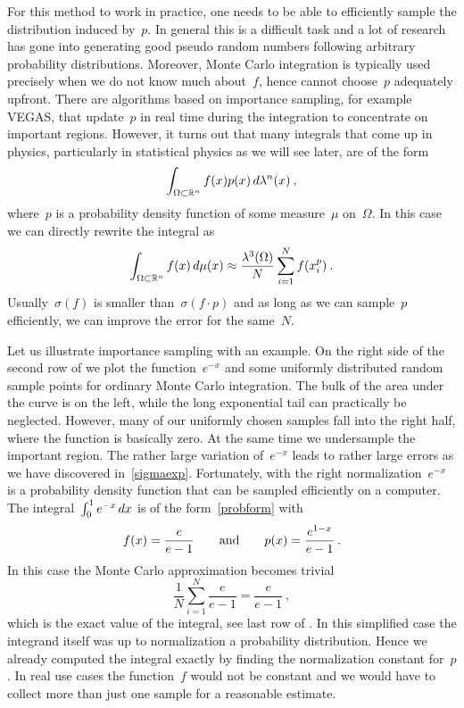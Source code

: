 For this method to work in practice, one needs to be able to efficiently sample
the distribution induced by~$p$. In general this is a difficult task and a lot
of research has gone into generating good pseudo random numbers following
arbitrary probability distributions. Moreover, Monte Carlo integration is
typically used precisely when we do not know much about~$f$, hence cannot
choose~$p$ adequately upfront. There are algorithms based on importance
sampling, for example VEGAS, that update~$p$ in real time during the integration
to concentrate on important regions. However, it turns out that many integrals
that come up in physics, particularly in statistical physics as we will see
later, are of the form
%
\begin{equation}\label{probform}
  \int_{\Omega \subset \mathbb{R}^n} f(x) p(x) \,d\lambda^n(x)\:,
\end{equation}
%
where~$p$ is a probability density function of some measure~$\mu$ on~$\Omega$.
In this case we can directly rewrite the integral as
%
\begin{equation}
  \int_{\Omega \subset \mathbb{R}^n} f(x) \,d\mu(x) \approx
  \frac{\lambda^3(\Omega)}{N} \sum_{i=1}^N {f(x_i^p)}\:.
\end{equation}
%
Usually~$\sigma(f)$ is smaller than~$\sigma(f\cdot p)$ and as long as we can
sample~$p$ efficiently, we can improve the error for the same~$N$.

Let us illustrate importance sampling with an example. On the right side of the
second row of  we plot the function~$e^{-x}$ and some
uniformly distributed random sample points for ordinary Monte Carlo integration.
The bulk of the area under the curve is on the left, while the long exponential
tail can practically be neglected. However, many of our uniformly chosen samples
fall into the right half, where the function is basically zero. At the same
time we undersample the important region. The rather large variation
of~$e^{-x}$ leads to rather large errors as we have discovered
in~\eqref{sigmaexp}. Fortunately, with the right normalization~$e^{-x}$ is a
probability density function that can be sampled efficiently on a computer. The
integral~$\int_0^1 e^{-x} \,dx$ is of the form~\eqref{probform} with
%
\begin{equation}
  f(x) =\frac{e}{e-1} \qquad\text{and}\qquad p(x) =\frac{e^{1-x}}{e-1}\:.
\end{equation}
%
In this case the Monte Carlo approximation becomes trivial
%
\begin{equation}
  \frac{1}{N} \sum_{i=1}^N \frac{e}{e-1} = \frac{e}{e-1} \:,
\end{equation}
%
which is the exact value of the integral, see last row of . In
this simplified case the integrand itself was up to normalization a probability
distribution. Hence we already computed the integral exactly by finding the
normalization constant for~$p$. In real use cases the function~$f$ would not be
constant and we would have to collect more than just one sample for a reasonable
estimate.

